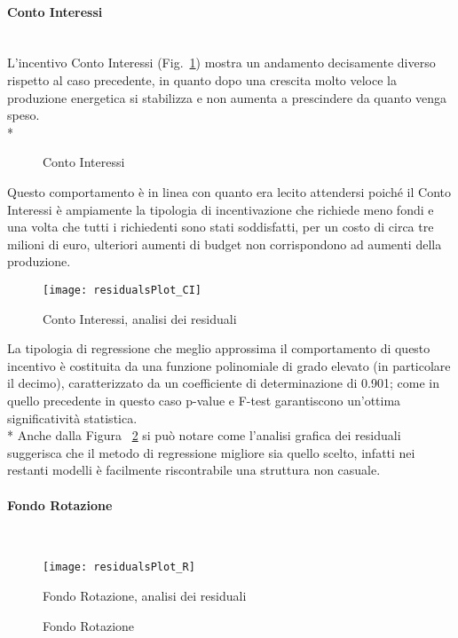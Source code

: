 \documentclass[12pt,a4paper,openright,twoside]{report}
\newcommand{\myparagraph}[1]{\paragraph{#1}\mbox{}\\}
\begin{document}
\myparagraph{Conto Interessi}

L'incentivo Conto Interessi (Fig.~\ref{graphSimCI}) mostra un andamento decisamente diverso rispetto al caso precedente, in quanto dopo una crescita molto veloce la produzione energetica si stabilizza e non aumenta a prescindere da quanto venga speso. \\* 

\begin{figure}[H]
	\centering
	\qquad
	\caption{Conto Interessi}
	\label{graphSimCI}
\end{figure}

Questo comportamento è in linea con quanto era lecito attendersi poiché il Conto Interessi è ampiamente la tipologia di incentivazione che richiede meno fondi e una volta che tutti i richiedenti sono stati soddisfatti, per un costo di circa tre milioni di euro, ulteriori aumenti di budget non corrispondono ad aumenti della produzione.

\begin{figure}[hbt]
	\centering
	\texttt{[image: residualsPlot\_CI]}
	\caption{Conto Interessi, analisi dei residuali}
	\label{residualsPlot_CI}
\end{figure}

La tipologia di regressione che meglio approssima il comportamento di questo incentivo è costituita da una funzione polinomiale di grado elevato (in particolare il decimo), caratterizzato da un coefficiente di determinazione di 0.901; come in quello precedente in questo caso p-value e F-test garantiscono un'ottima significatività statistica.\\* 
Anche dalla Figura ~\ref{residualsPlot_CI} si può notare come l'analisi grafica dei residuali suggerisca che il metodo di regressione migliore sia quello scelto, infatti nei restanti modelli è facilmente riscontrabile una struttura non casuale.

\myparagraph{Fondo Rotazione}

\begin{figure}[hbt]
	\centering
	\texttt{[image: residualsPlot\_R]}
	\caption{Fondo Rotazione, analisi dei residuali}
	\label{residualsPlot_R}
\end{figure}

\begin{figure}[H]
	\centering
	\qquad
	\caption{Fondo Rotazione}
	\label{graphSimR}
\end{figure}
\end{document}
